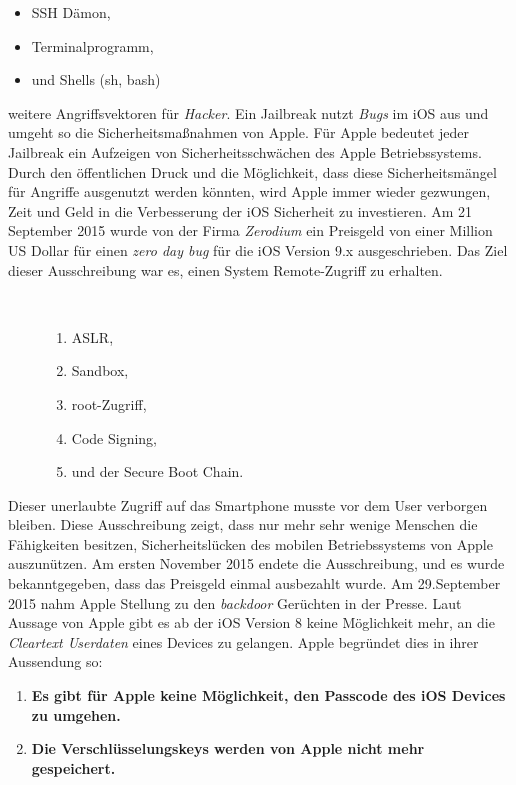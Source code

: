 \begin{itemize}
    \item SSH Dämon,
    \item Terminalprogramm,
    \item und Shells (sh, bash)
\end{itemize}
weitere Angriffsvektoren für \textit{\glqq Hacker\grqq{}}.
Ein Jailbreak nutzt \textit{\glqq Bugs\grqq{}} im iOS aus und umgeht so die Sicherheitsmaßnahmen von Apple. Für Apple bedeutet jeder Jailbreak ein Aufzeigen von Sicherheitsschwächen des Apple Betriebssystems. Durch den öffentlichen Druck und die Möglichkeit, dass diese Sicherheitsmängel für Angriffe ausgenutzt werden könnten, wird Apple immer wieder gezwungen, Zeit und Geld in die Verbesserung der iOS Sicherheit zu investieren. 
Am 21 September 2015 wurde von der Firma \textit{\glqq Zerodium\grqq{}} ein Preisgeld von einer Million US Dollar für einen \textit{\glqq zero day bug\grqq{}} für die iOS Version 9.x ausgeschrieben. Das Ziel dieser Ausschreibung war es, einen System Remote-Zugriff zu erhalten. 
\begin{description}
    \item[\parbox{\textwidth} {Folgende iOS Sicherheitsmechanismen mussten durch diesen Jailbreak umgangen werden}]~\par
    \begin{enumerate}
        \item ASLR, 
        \item Sandbox,
        \item root-Zugriff, 
        \item Code Signing, 
        \item und der Secure Boot Chain.
    \end{enumerate}
\end{description} 
Dieser unerlaubte Zugriff auf das Smartphone musste vor dem User verborgen bleiben. Diese Ausschreibung zeigt, dass nur mehr sehr wenige Menschen die Fähigkeiten besitzen, Sicherheitslücken des mobilen Betriebssystems von Apple auszunützen. Am ersten November 2015 endete die Ausschreibung, und es wurde bekanntgegeben, dass das Preisgeld einmal ausbezahlt wurde. 
Am 29.September 2015 nahm Apple Stellung  zu den \textit{\glqq backdoor\grqq{}} Gerüchten in der Presse. Laut Aussage von Apple gibt es ab der iOS Version 8 keine Möglichkeit mehr, an die \textit{\glqq Cleartext Userdaten\grqq{}} eines Devices zu gelangen. Apple begründet dies in ihrer Aussendung so:
\begin{enumerate}
    \item \textbf{Es gibt für Apple keine Möglichkeit, den Passcode des iOS Devices zu umgehen.}
    \item \textbf{Die Verschlüsselungskeys werden von Apple nicht mehr gespeichert.}
\end{enumerate}
